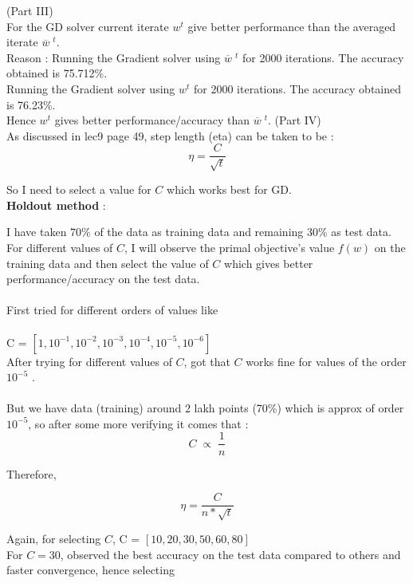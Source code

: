 \documentclass[a4paper,11pt]{article}
\begin{document}
\begin{mlsolution}

(Part III)\\

For the GD solver current iterate $w^{t}$ give better performance than the averaged iterate $\overline{w}\;^t$.\\

Reason : Running the Gradient solver using $\overline{w}\;^t$ for 2000 iterations. The accuracy obtained is 75.712\;\%.\\

Running the Gradient solver using $w^{t}$ for 2000 iterations. The accuracy obtained is 76.23\;\%.\\

Hence $w^{t}$ gives better performance/accuracy than $\overline{w}\;^t$.
\newpage
(Part IV)\\

As discussed in lec9 page 49, step length (eta) can be taken to be :
\[
\eta = \frac{C}{\sqrt{t}}
\]

So I need to select a value for $C$ which works best for GD.\\

\textbf{Holdout method} :

I have taken 70\;\% of the data as training data and remaining 30\;\% as test data. For different values of $C$, I will observe the primal objective's value $f(w)$ on the training data and then select the value of $C$ which gives better performance/accuracy on the test data.\\\\
First tried for different orders of values like \\\\
C = $ [1, 10^{-1}, 10^{-2}, 10^{-3}, 10^{-4}, 10^{-5}, 10^{-6}] $\\
After trying for different values of $C$, got that $C$ works fine for values of the order $10^{-5}$ .\\\\
But we have data (training) around 2 lakh points (70\;\%) which is approx of order $10^{-5}$, so after some more verifying it comes that :
\[
C\; \propto \;\frac{1}{n}
\]

Therefore, 

\[
\eta = \frac{C}{n*\sqrt{t}}
\]

Again, for selecting $C$, 
C = $ [10, 20, 30, 50, 60, 80] $\\

For $C = 30$, observed the best accuracy on the test data compared to others and faster convergence, hence selecting 


\end{mlsolution}
\end{document}
